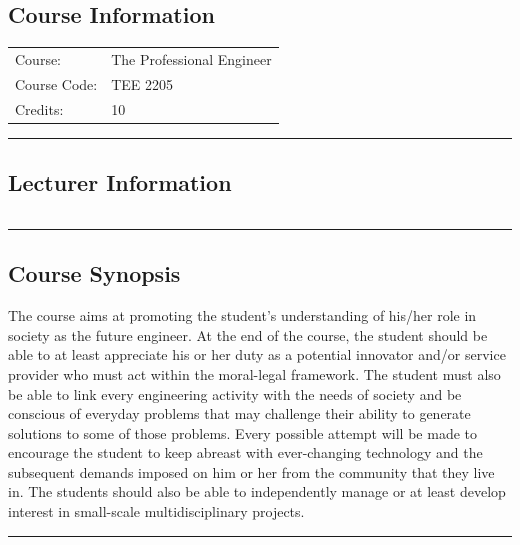 
\subsection*{Course Information}
\vspace{0ex}%
\noindent\parbox{0.5\textwidth}{%
    \noindent\begin{tabular}{@{}ll}
                 \textsf{Course:}          & 	The Professional Engineer \Romannum{1} \\
                 \textsf{Course Code:}         & 	TEE 2205    \\
                 \textsf{Credits:}    & 	10
    \end{tabular}}
\vspace{2ex}\hrule\vspace{2ex}

\subsection*{Lecturer Information}
\noindent\parbox{0.5\textwidth}{%
    \noindent\begin{tabular}{@{}ll}
                 
    \end{tabular}}
\vspace{2ex}\hrule\vspace{2ex}


\subsection*{Course Synopsis}
The course aims at promoting the student’s understanding of his/her role in society as the future engineer.
At the end of the course, the student should be able to at least appreciate his or her duty as a potential innovator and/or service provider who must act within the moral-legal framework.
The student must also be able to link every engineering activity with the needs of society and be conscious of everyday problems that may challenge their ability to generate solutions to some of those problems.
Every possible attempt will be made to encourage the student to keep abreast with ever-changing technology and the subsequent demands imposed on him or her from the community that they live in.
The students should also be able to independently manage or at least develop interest in small-scale multidisciplinary projects.
\vspace{2ex} \hrule\vspace{2ex}

